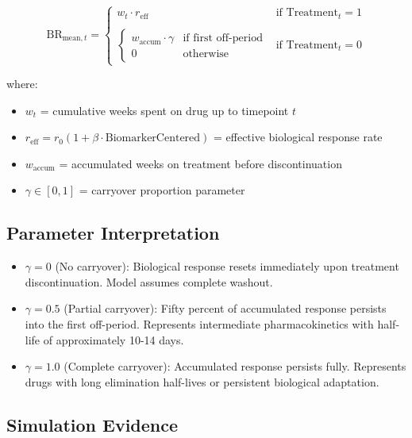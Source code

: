 \documentclass[11pt,a4paper]{article}
\begin{document}
\begin{equation}
  \text{BR}_{\text{mean},t} = \begin{cases}
    w_t \cdot r_{\text{eff}} & \text{if } \text{Treatment}_t = 1 \\
    \\
    \begin{cases}
      w_{\text{accum}} \cdot \gamma & \text{if first off-period} \\
      0 & \text{otherwise}
    \end{cases}
    & \text{if } \text{Treatment}_t = 0
  \end{cases}
\end{equation}

where:

\begin{itemize}
  \item $w_t$ = cumulative weeks spent on drug up to timepoint $t$
  \item $r_{\text{eff}} = r_0(1 + \beta \cdot \text{BiomarkerCentered})$ = effective biological response rate
  \item $w_{\text{accum}}$ = accumulated weeks on treatment before discontinuation
  \item $\gamma \in [0, 1]$ = carryover proportion parameter
\end{itemize}

\subsection{Parameter Interpretation}

\begin{itemize}
  \item \textbf{$\gamma = 0$} (No carryover): Biological response resets immediately upon treatment discontinuation. Model assumes complete washout.

  \item \textbf{$\gamma = 0.5$} (Partial carryover): Fifty percent of accumulated response persists into the first off-period. Represents intermediate pharmacokinetics with half-life of approximately 10-14 days.

  \item \textbf{$\gamma = 1.0$} (Complete carryover): Accumulated response persists fully. Represents drugs with long elimination half-lives or persistent biological adaptation.
\end{itemize}

\subsection{Simulation Evidence}
\end{document}
